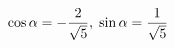 \documentclass[preview]{standalone}
\begin{document}
\begin{align*}
\special{dvisvgm:raw <g id='unique000'>}\cos\alpha=-\frac{2}{\sqrt{5}},\;\sin\alpha=\frac{1}{\sqrt{5}}\special{dvisvgm:raw </g>}
\end{align*}
\end{document}

